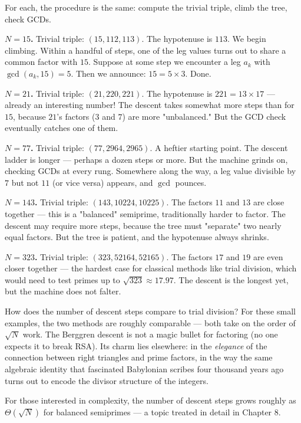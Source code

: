For each, the procedure is the same: compute the trivial triple, climb the tree, check GCDs.

\textbf{$N = 15$.}
Trivial triple: $(15, 112, 113)$. The hypotenuse is $113$. We begin climbing. Within a handful of steps, one of the leg values turns out to share a common factor with $15$. Suppose at some step we encounter a leg $a_k$ with $\gcd(a_k, 15) = 5$. Then we announce: $15 = 5 \times 3$. Done.

\textbf{$N = 21$.}
Trivial triple: $(21, 220, 221)$. The hypotenuse is $221 = 13 \times 17$ --- already an interesting number! The descent takes somewhat more steps than for $15$, because $21$'s factors ($3$ and $7$) are more "unbalanced." But the GCD check eventually catches one of them.

\textbf{$N = 77$.}
Trivial triple: $(77, 2964, 2965)$. A heftier starting point. The descent ladder is longer --- perhaps a dozen steps or more. But the machine grinds on, checking GCDs at every rung. Somewhere along the way, a leg value divisible by $7$ but not $11$ (or vice versa) appears, and $\gcd$ pounces.

\textbf{$N = 143$.}
Trivial triple: $(143, 10224, 10225)$. The factors $11$ and $13$ are close together --- this is a "balanced" semiprime, traditionally harder to factor. The descent may require more steps, because the tree must "separate" two nearly equal factors. But the tree is patient, and the hypotenuse always shrinks.

\textbf{$N = 323$.}
Trivial triple: $(323, 52164, 52165)$. The factors $17$ and $19$ are even closer together --- the hardest case for classical methods like trial division, which would need to test primes up to $\sqrt{323} \approx 17.97$. The descent is the longest yet, but the machine does not falter.

How does the number of descent steps compare to trial division? For these small examples, the two methods are roughly comparable --- both take on the order of $\sqrt{N}$ work. The Berggren descent is not a magic bullet for factoring (no one expects it to break RSA). Its charm lies elsewhere: in the \textit{elegance} of the connection between right triangles and prime factors, in the way the same algebraic identity that fascinated Babylonian scribes four thousand years ago turns out to encode the divisor structure of the integers.

For those interested in complexity, the number of descent steps grows roughly as $\Theta(\sqrt{N})$ for balanced semiprimes --- a topic treated in detail in Chapter 8.

